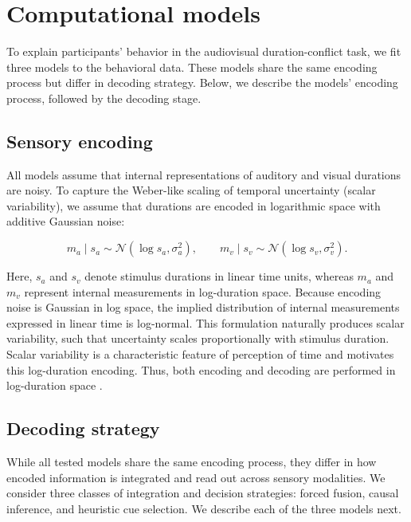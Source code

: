 \documentclass{jov}
\providecommand{\citep}[1]{\cite{#1}}
\begin{document}
\section{Computational models}
To explain participants' behavior in the audiovisual duration-conflict task, we fit three models to the behavioral data. These models share the same encoding process but differ in decoding strategy. Below, we describe the models' encoding process, followed by the decoding stage.

\subsection{Sensory encoding}
All models assume that internal representations of auditory and visual durations are noisy. To capture the Weber-like scaling of temporal uncertainty (scalar variability), we assume that durations are encoded in logarithmic space with additive Gaussian noise: 

\begin{equation}
m_a \mid s_a \sim \mathcal{N}(\log s_a,\sigma_a^2), \qquad
m_v \mid s_v \sim \mathcal{N}(\log s_v,\sigma_v^2).
\end{equation}

\noindent Here, $s_a$ and $s_v$ denote stimulus durations in linear time units, whereas $m_a$ and $m_v$ represent internal measurements in log-duration space. Because encoding noise is Gaussian in log space, the implied distribution of internal measurements expressed in linear time is log-normal. This formulation naturally produces scalar variability, such that uncertainty scales proportionally with stimulus duration. Scalar variability is a characteristic feature of perception of time and motivates this log-duration encoding. Thus, both encoding and decoding are performed in log-duration space \citep{killeen1987optimal, wittmann2009inner,ren2020ensemble}.

\subsection{Decoding strategy}
While all tested models share the same encoding process, they differ in how encoded information is integrated and read out across sensory modalities. We consider three classes of integration and decision strategies: forced fusion, causal inference, and heuristic cue selection. We describe each of the three models next.  

% 
\end{document}
